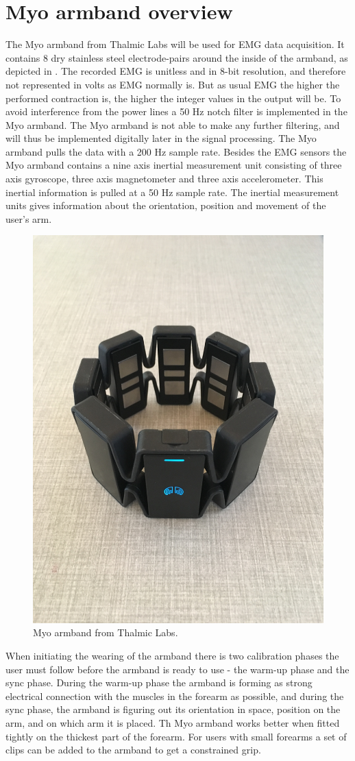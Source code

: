 \section{Myo armband overview}

The Myo armband from Thalmic Labs will be used for EMG data acquisition. It contains 8 dry stainless steel electrode-pairs around the inside of the armband, as depicted in . The recorded EMG is unitless and in 8-bit resolution, and therefore not represented in volts as EMG normally is. But as usual EMG the higher the performed contraction is, the higher the integer values in the output will be. To avoid interference from the power lines a 50 Hz notch filter is implemented in the Myo armband. The Myo armband is not able to make any further filtering, and will thus be implemented digitally later in the signal processing. The Myo armband pulls the data with a 200 Hz sample rate. Besides the EMG sensors the Myo armband contains a nine axis inertial measurement unit consisting of three axis gyroscope, three axis magnetometer and three axis accelerometer. This inertial information is pulled at a 50 Hz sample rate. The inertial measurement units gives information about the orientation, position and movement of the user’s arm. \cite{Myoarmband2013}

\begin{figure}[H]                 
	\includegraphics[width=.4\textwidth]{figures/xBackground/myoband}  
	\caption{Myo armband from Thalmic Labs.}
	\label{fig:myoarmband} 
\end{figure}

When initiating the wearing of the armband there is two calibration phases the user must follow before the armband is ready to use - the warm-up phase and the sync phase. During the warm-up phase the armband is forming as strong electrical connection with the muscles in the forearm as possible, and during the sync phase, the armband is figuring out its orientation in space, position on the arm, and on which arm it is placed. Th Myo armband works better when fitted tightly on the thickest part of the forearm. For users with small forearms a set of clips can be added to the armband to get a constrained grip. \cite{Myoarmband2013}
